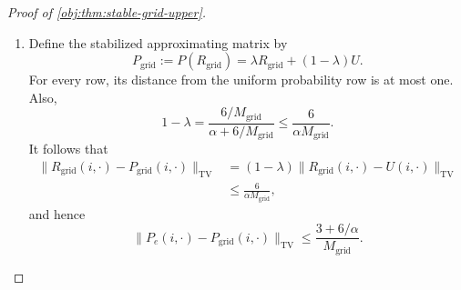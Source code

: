 \documentclass[11pt]{article}
\begin{document}
\begin{proof}[Proof of \cref{obj:thm:stable-grid-upper}]
\begin{enumerate}
Define the rounded initial row, transition rows, and rewards by
\[
\nu_{\mathrm{grid}}:=\mathcal R_{\mathrm{grid}}(d_b),
\qquad
R_{\mathrm{grid}}(i,\cdot)
:=
\mathcal R_{\mathrm{grid}}(P_e(i,\cdot)),
\qquad
r_{\mathrm{grid}}(i)
:=
\frac{\lfloor M_{\mathrm{grid}}r_e(i)\rfloor}{M_{\mathrm{grid}}}.
\]
They satisfy
\[
\|\nu_{\mathrm{grid}}-d_b\|_{\mathrm{TV}}
\le\frac3{M_{\mathrm{grid}}},
\qquad
\max_i\|R_{\mathrm{grid}}(i,\cdot)-P_e(i,\cdot)\|_{\mathrm{TV}}
\le\frac3{M_{\mathrm{grid}}},
\]
\[
0\le r_{\mathrm{grid}}(i)\le1,
\qquad
0\le r_e(i)-r_{\mathrm{grid}}(i)
\le\frac1{M_{\mathrm{grid}}}.
\]
For each pair of rows, the triangle inequality gives
\[
\begin{aligned}
\|R_{\mathrm{grid}}(i,\cdot)-R_{\mathrm{grid}}(j,\cdot)\|_{\mathrm{TV}}
&\le
\|R_{\mathrm{grid}}(i,\cdot)-P_e(i,\cdot)\|_{\mathrm{TV}}\\
&\quad+
\|P_e(i,\cdot)-P_e(j,\cdot)\|_{\mathrm{TV}}\\
&\quad+
\|P_e(j,\cdot)-R_{\mathrm{grid}}(j,\cdot)\|_{\mathrm{TV}}\\
&\le\alpha+\frac6{M_{\mathrm{grid}}}.
\end{aligned}
\]
Taking the maximum over the row pair proves
\[
\delta(R_{\mathrm{grid}})
\le\alpha+\frac6{M_{\mathrm{grid}}},
\qquad
(\nu_{\mathrm{grid}},R_{\mathrm{grid}},r_{\mathrm{grid}})
\in\mathcal C_{M_{\mathrm{grid}}}.
\]

\item Define the stabilized approximating matrix by
\[
P_{\mathrm{grid}}
:=
P(R_{\mathrm{grid}})
=
\lambda R_{\mathrm{grid}}+(1-\lambda)U.
\]
For every row, its distance from the uniform probability row is at most one. Also,
\[
1-\lambda
=
\frac{6/M_{\mathrm{grid}}}{\alpha+6/M_{\mathrm{grid}}}
\le\frac6{\alpha M_{\mathrm{grid}}}.
\]
It follows that
\[
\begin{aligned}
\|R_{\mathrm{grid}}(i,\cdot)-P_{\mathrm{grid}}(i,\cdot)\|_{\mathrm{TV}}
&=
(1-\lambda)
\|R_{\mathrm{grid}}(i,\cdot)-U(i,\cdot)\|_{\mathrm{TV}}\\
&\le\frac6{\alpha M_{\mathrm{grid}}},
\end{aligned}
\]
and hence
\[
\|P_e(i,\cdot)-P_{\mathrm{grid}}(i,\cdot)\|_{\mathrm{TV}}
\le
\frac{3+6/\alpha}{M_{\mathrm{grid}}}.
\]


\end{enumerate}
\end{proof}
\end{document}
